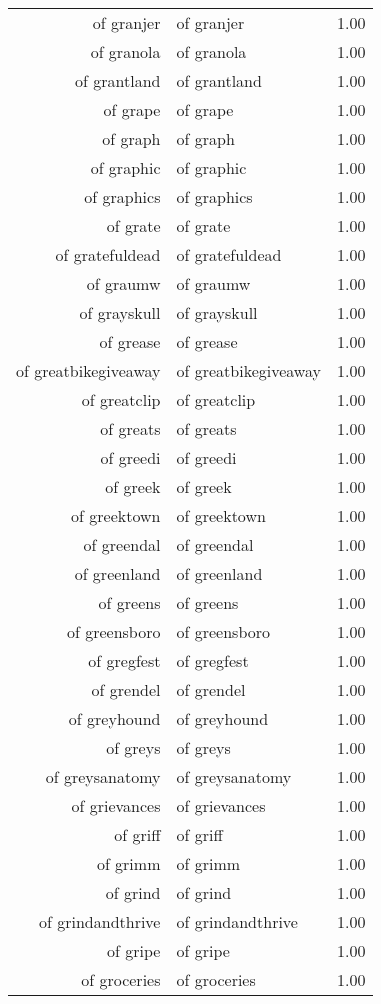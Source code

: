 \begin{table}[ht]
\begin{tabular}{rlr}
  of granjer & of granjer & 1.00 \\ 
  of granola & of granola & 1.00 \\ 
  of grantland & of grantland & 1.00 \\ 
  of grape & of grape & 1.00 \\ 
  of graph & of graph & 1.00 \\ 
  of graphic & of graphic & 1.00 \\ 
  of graphics & of graphics & 1.00 \\ 
  of grate & of grate & 1.00 \\ 
  of gratefuldead & of gratefuldead & 1.00 \\ 
  of graumw & of graumw & 1.00 \\ 
  of grayskull & of grayskull & 1.00 \\ 
  of grease & of grease & 1.00 \\ 
  of greatbikegiveaway & of greatbikegiveaway & 1.00 \\ 
  of greatclip & of greatclip & 1.00 \\ 
  of greats & of greats & 1.00 \\ 
  of greedi & of greedi & 1.00 \\ 
  of greek & of greek & 1.00 \\ 
  of greektown & of greektown & 1.00 \\ 
  of greendal & of greendal & 1.00 \\ 
  of greenland & of greenland & 1.00 \\ 
  of greens & of greens & 1.00 \\ 
  of greensboro & of greensboro & 1.00 \\ 
  of gregfest & of gregfest & 1.00 \\ 
  of grendel & of grendel & 1.00 \\ 
  of greyhound & of greyhound & 1.00 \\ 
  of greys & of greys & 1.00 \\ 
  of greysanatomy & of greysanatomy & 1.00 \\ 
  of grievances & of grievances & 1.00 \\ 
  of griff & of griff & 1.00 \\ 
  of grimm & of grimm & 1.00 \\ 
  of grind & of grind & 1.00 \\ 
  of grindandthrive & of grindandthrive & 1.00 \\ 
  of gripe & of gripe & 1.00 \\ 
  of groceries & of groceries & 1.00 \\ 

\end{tabular}
\end{table}
